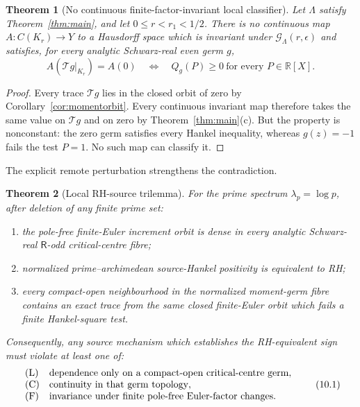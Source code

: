 \documentclass[11pt]{article}
\newtheorem{theorem}{Theorem}[section]
\newcommand{\R}{\mathbb R}
\newcommand{\cG}{\mathcal G}
\newcommand{\cT}{\mathcal T}
\newcommand{\FE}{\mathsf R}
\begin{document}
\begin{theorem}[No continuous finite-factor-invariant local classifier]
\label{thm:noclassifier}
Let \(\Lambda\) satisfy Theorem~\ref{thm:main}, and let \(0\leq r<r_1<1/2\).
There is no continuous map \(A:C(K_r)\to Y\) to a Hausdorff space which is
invariant under \(\cG_\Lambda(r,\epsilon)\) and satisfies, for every analytic
Schwarz-real even germ \(g\),
\[
 A(\cT g|_{K_r})=A(0)
 \quad\Longleftrightarrow\quad
 Q_g(P)\geq0\ \text{for every }P\in\R[X].
\]
\end{theorem}

\begin{proof}
Every trace \(\cT g\) lies in the closed orbit of zero by
Corollary~\ref{cor:momentorbit}.  Every continuous invariant map therefore takes the
same value on \(\cT g\) and on zero by Theorem~\ref{thm:main}(c).  But the property
is nonconstant: the zero germ satisfies every Hankel inequality, whereas
\(g(z)=-1\) fails the test \(P=1\).  No such map can classify it.
\end{proof}

The explicit remote perturbation strengthens the contradiction.

\begin{theorem}[Local RH-source trilemma]\label{thm:trilemma}
For the prime spectrum \(\lambda_p=\log p\), after deletion of any finite prime set:
\begin{enumerate}[label=\textup{(\alph*)}]
\item the pole-free finite-Euler increment orbit is dense in every analytic
Schwarz-real \(\FE\)-odd critical-centre fibre;
\item normalized prime--archimedean source-Hankel positivity is equivalent to RH;
\item every compact-open neighbourhood in the normalized moment-germ fibre contains
an exact trace from the same closed finite-Euler orbit which fails a finite
Hankel-square test.
\end{enumerate}
Consequently, any source mechanism which establishes the RH-equivalent sign must
violate at least one of:
\[
\begin{array}{ll}
\textup{(L)}&\text{dependence only on a compact-open critical-centre germ},\\
\textup{(C)}&\text{continuity in that germ topology},\\
\textup{(F)}&\text{invariance under finite pole-free Euler-factor changes}.
\end{array}
\tag{10.1}
\]
\end{theorem}
\end{document}
